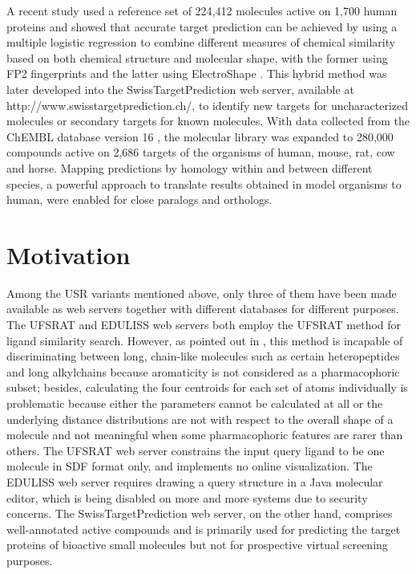 A recent study \citep{1407} used a reference set of 224,412 molecules active on 1,700 human proteins and showed that accurate target prediction can be achieved by using a multiple logistic regression to combine different measures of chemical similarity based on both chemical structure and molecular shape, with the former using FP2 fingerprints and the latter using ElectroShape \citep{1338}. This hybrid method was later developed into the SwissTargetPrediction \citep{1408} web server, available at http://www.swisstargetprediction.ch/, to identify new targets for uncharacterized molecules or secondary targets for known molecules. With data collected from the ChEMBL database version 16 \citep{1441}, the molecular library was expanded to 280,000 compounds active on 2,686 targets of the organisms of human, mouse, rat, cow and horse. Mapping predictions by homology within and between different species, a powerful approach to translate results obtained in model organisms to human, were enabled for close paralogs and orthologs.

\section{Motivation}

Among the USR variants mentioned above, only three of them \citep{1436,1437,1408} have been made available as web servers together with different databases for different purposes. The UFSRAT \citep{1436} and EDULISS \citep{1437} web servers both employ the UFSRAT \citep{1436} method for ligand similarity search. However, as pointed out in \citep{1331}, this method is incapable of discriminating between long, chain-like molecules such as certain heteropeptides and long alkylchains because aromaticity is not considered as a pharmacophoric subset; besides, calculating the four centroids for each set of atoms individually is problematic because either the parameters cannot be calculated at all or the underlying distance distributions are not with respect to the overall shape of a molecule and not meaningful when some pharmacophoric features are rarer than others. The UFSRAT \citep{1436} web server constrains the input query ligand to be one molecule in SDF format only, and implements no online visualization. The EDULISS \citep{1437} web server requires drawing a query structure in a Java molecular editor, which is being disabled on more and more systems due to security concerns. The SwissTargetPrediction \citep{1408} web server, on the other hand, comprises well-annotated active compounds and is primarily used for predicting the target proteins of bioactive small molecules but not for prospective virtual screening purposes.

